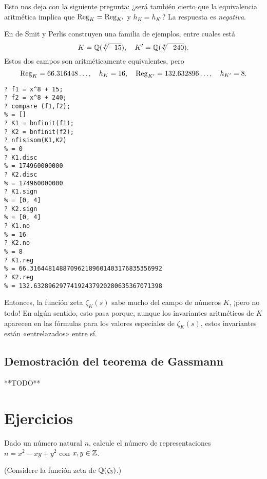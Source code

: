 Esto nos deja con la siguiente pregunta: ¿será también cierto que la
equivalencia aritmética implica que $\operatorname{Reg}_K = \operatorname{Reg}_{K'}$ y $h_K = h_{K'}$? La
respuesta es \emph{negativa}.

\begin{ejemplo}
  En \cite{deSmit-Perlis-1994} de Smit y Perlis
  construyen una familia de ejemplos, entre cuales está
  \[ K = \mathbb{Q} (\sqrt[8]{-15}), \quad K' = \mathbb{Q} (\sqrt[8]{-240}). \]
  Estos dos campos son aritméticamente equivalentes, pero
  \[ \operatorname{Reg}_K = 66.316448\ldots, \quad
    h_K = 16, \quad
    \operatorname{Reg}_{K'} = 132.632896\ldots, \quad
    h_{K'} = 8. \]

  \begin{shaded}\small
\begin{verbatim}
? f1 = x^8 + 15;
? f2 = x^8 + 240;
? compare (f1,f2);
% = []
? K1 = bnfinit(f1);
? K2 = bnfinit(f2);
? nfisisom(K1,K2)
% = 0
? K1.disc
% = 174960000000
? K2.disc
% = 174960000000
? K1.sign
% = [0, 4]
? K2.sign
% = [0, 4]
? K1.no
% = 16
? K2.no
% = 8
? K1.reg
% = 66.316448148870962189601403176835356992
? K2.reg
% = 132.63289629774192437920280635367071398
\end{verbatim}
  \end{shaded}
\end{ejemplo}

Entonces, la función zeta $\zeta_K (s)$ sabe mucho del campo de números $K$,
¡pero no todo! En algún sentido, esto pasa porque, aunque los invariantes
aritméticos de $K$ aparecen en las fórmulas para los valores especiales de
$\zeta_K (s)$, estos invariantes están «entrelazados» entre sí.

\subsection{Demostración del teorema de Gassmann}

**TODO**


\pagebreak


\section*{Ejercicios}

\begin{ejercicio}
  Dado un número natural $n$, calcule el número de representaciones
  $n = x^2 - xy + y^2$ con $x,y \in \mathbb{Z}$.

  \noindent (Considere la función zeta de $\mathbb{Q} (\zeta_3)$.)
\end{ejercicio}


